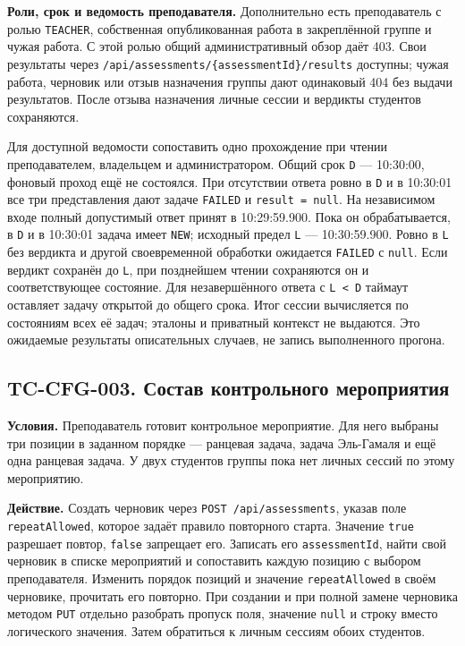 \documentclass[12pt,a4paper]{article}
\begin{document}
\textbf{Роли, срок и ведомость преподавателя.} Дополнительно есть преподаватель с ролью \texttt{TEACHER}, собственная опубликованная работа в закреплённой группе и чужая работа. С этой ролью общий административный обзор даёт 403. Свои результаты через \texttt{/\allowbreak{}api/\allowbreak{}assessments/\allowbreak{}\{assessment\allowbreak{}Id\}/\allowbreak{}results} доступны; чужая работа, черновик или отзыв назначения группы дают одинаковый 404 без выдачи результатов. После отзыва назначения личные сессии и вердикты студентов сохраняются.

Для доступной ведомости сопоставить одно прохождение при чтении преподавателем, владельцем и администратором. Общий срок \texttt{D} --- 10:30:00, фоновый проход ещё не состоялся. При отсутствии ответа ровно в \texttt{D} и в 10:30:01 все три представления дают задаче \texttt{FAILED} и \texttt{result\ =\ null}. На независимом входе полный допустимый ответ принят в 10:29:59.900. Пока он обрабатывается, в \texttt{D} и в 10:30:01 задача имеет \texttt{NEW}; исходный предел \texttt{L} --- 10:30:59.900. Ровно в \texttt{L} без вердикта и другой своевременной обработки ожидается \texttt{FAILED} с \texttt{null}. Если вердикт сохранён до \texttt{L}, при позднейшем чтении сохраняются он и соответствующее состояние. Для незавершённого ответа с \texttt{L\ \textless{}\ D} таймаут оставляет задачу открытой до общего срока. Итог сессии вычисляется по состояниям всех её задач; эталоны и приватный контекст не выдаются. Это ожидаемые результаты описательных случаев, не запись выполненного прогона.

\subsection{TC-CFG-003. Состав контрольного мероприятия}\label{tc-cfg-003-ux441ux43eux441ux442ux430ux432-ux43aux43eux43dux442ux440ux43eux43bux44cux43dux43eux433ux43e-ux43cux435ux440ux43eux43fux440ux438ux44fux442ux438ux44f}

\hypertarget{tc-cfg-003-состав-контрольного-мероприятия}{}

\hypertarget{tc-cfg-003}{}

\textbf{Условия.} Преподаватель готовит контрольное мероприятие. Для него выбраны три позиции в заданном порядке --- ранцевая задача, задача Эль-Гамаля и ещё одна ранцевая задача. У двух студентов группы пока нет личных сессий по этому мероприятию.

\textbf{Действие.} Создать черновик через \texttt{POST /\allowbreak{}api/\allowbreak{}assessments}, указав поле \texttt{repeat\allowbreak{}Allowed}, которое задаёт правило повторного старта. Значение \texttt{true} разрешает повтор, \texttt{false} запрещает его. Записать его \texttt{assessment\allowbreak{}Id}, найти свой черновик в списке мероприятий и сопоставить каждую позицию с выбором преподавателя. Изменить порядок позиций и значение \texttt{repeat\allowbreak{}Allowed} в своём черновике, прочитать его повторно. При создании и при полной замене черновика методом \texttt{PUT} отдельно разобрать пропуск поля, значение \texttt{null} и строку вместо логического значения. Затем обратиться к личным сессиям обоих студентов.
\end{document}
